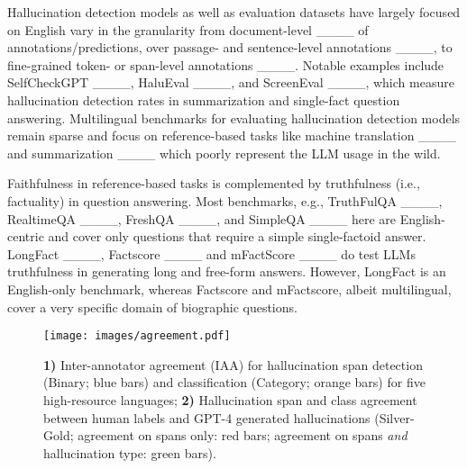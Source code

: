 
%
Hallucination detection models as well as evaluation datasets have largely focused on English vary in the granularity from document-level ____ of annotations/predictions, over passage- and sentence-level annotations ____, to fine-grained token- or span-level annotations ____. Notable examples include SelfCheckGPT ____, HaluEval ____, and ScreenEval ____, which measure hallucination detection rates in summarization and single-fact question answering. Multilingual benchmarks for evaluating hallucination detection models remain sparse and focus on reference-based tasks like machine translation ____ and summarization ____ which poorly represent the LLM usage in the wild.   

Faithfulness in reference-based tasks is complemented by truthfulness (i.e., factuality) in question answering. 
Most benchmarks, e.g., TruthFulQA ____, RealtimeQA ____, FreshQA ____, and SimpleQA ____ here are English-centric and cover only questions that require a simple single-factoid answer. 
LongFact ____, Factscore ____ and mFactScore ____ do test LLMs truthfulness in generating long and free-form answers. However, LongFact is an English-only benchmark, whereas Factscore and mFactscore, albeit multilingual, cover a very specific domain of biographic questions. 

\begin{figure}[t]
    \centering
    \texttt{[image: images/agreement.pdf]}
    \caption{\textbf{1)} Inter-annotator agreement (IAA) for hallucination span detection (Binary; blue bars) and classification (Category; orange bars) for five high-resource languages; \textbf{2)} Hallucination span and class agreement between human labels and GPT-4 generated hallucinations (Silver-Gold; agreement on spans only: red bars; agreement on spans \textit{and} hallucination type: green bars).}
    \label{fig:agreement-metrics}
    \vspace{-0.5em}
\end{figure}